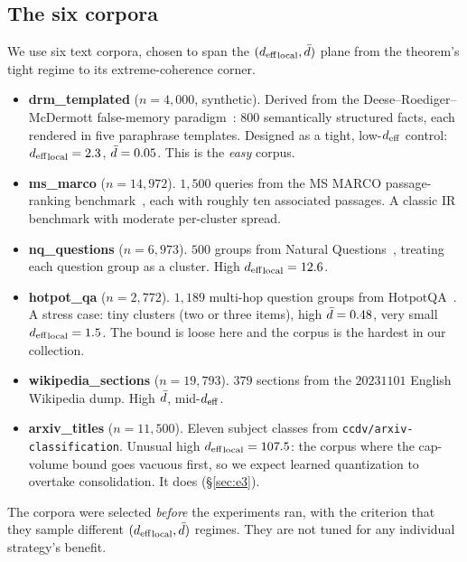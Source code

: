 \subsection{The six corpora}
\label{sec:experiments:corpora}

We use six text corpora, chosen to span the $({d_{\mathrm{eff}}}_{\mathrm{local}},
\bar{d})$ plane from the theorem's tight regime to its extreme-coherence
corner.

\begin{itemize}[leftmargin=1.8em, itemsep=2pt]
\item \textbf{drm\_templated} ($n = 4{,}000$, synthetic). Derived from
the Deese--Roediger--McDermott false-memory
paradigm~\cite{roediger1995drm}: $800$ semantically structured facts,
each rendered in five paraphrase templates. Designed as a tight,
low-${d_{\mathrm{eff}}}$ control: ${d_{\mathrm{eff}}}_{\mathrm{local}} = 2.3$, $\bar{d} = 0.05$.
This is the \emph{easy} corpus.
\item \textbf{ms\_marco} ($n = 14{,}972$). $1{,}500$ queries from the
MS MARCO passage-ranking benchmark~\cite{nguyen2016msmarco}, each with
roughly ten associated passages. A classic IR benchmark with moderate
per-cluster spread.
\item \textbf{nq\_questions} ($n = 6{,}973$). $500$ groups from
Natural Questions~\cite{kwiatkowski2019nq}, treating each question
group as a cluster. High ${d_{\mathrm{eff}}}_{\mathrm{local}} = 12.6$.
\item \textbf{hotpot\_qa} ($n = 2{,}772$). $1{,}189$ multi-hop question
groups from HotpotQA~\cite{yang2018hotpotqa}. A stress case: tiny
clusters (two or three items), high $\bar{d} = 0.48$, very small
${d_{\mathrm{eff}}}_{\mathrm{local}} = 1.5$. The bound is loose here and the
corpus is the hardest in our collection.
\item \textbf{wikipedia\_sections} ($n = 19{,}793$). $379$ sections
from the $20231101$ English Wikipedia dump. High $\bar{d}$, mid-${d_{\mathrm{eff}}}$.
\item \textbf{arxiv\_titles} ($n = 11{,}500$). Eleven subject classes
from \texttt{ccdv/arxiv-classification}. Unusual high
${d_{\mathrm{eff}}}_{\mathrm{local}} = 107.5$: the corpus where the cap-volume
bound goes vacuous first, so we expect learned quantization to
overtake consolidation. It does (\S\ref{sec:e3}).
\end{itemize}

The corpora were selected \emph{before} the experiments ran, with the
criterion that they sample different $({d_{\mathrm{eff}}}_{\mathrm{local}}, \bar{d})$
regimes. They are not tuned for any individual strategy's benefit.

